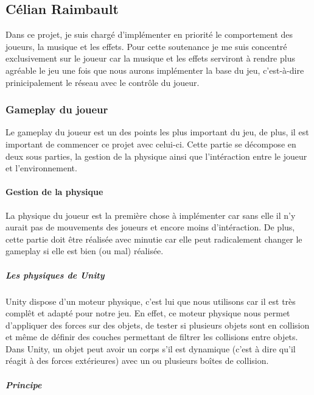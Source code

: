 \documentclass{article}
\begin{document}
\newpage
\subsection{Célian Raimbault}

Dans ce projet, je suis chargé d'implémenter en priorité le comportement des joueurs, la musique et les effets. Pour cette soutenance je me suis concentré exclusivement sur le joueur car la musique et les effets serviront à rendre plus agréable le jeu une fois que nous aurons implémenter la base du jeu, c'est-à-dire prinicipalement le réseau avec le contrôle du joueur.

\subsubsection{Gameplay du joueur}

Le gameplay du joueur est un des points les plus important du jeu, de plus, il est important de commencer ce projet avec celui-ci. Cette partie se décompose en deux sous parties, la gestion de la physique ainsi que l'intéraction entre le joueur et l'environnement.

\paragraph{Gestion de la physique}

La physique du joueur est la première chose à implémenter car sans elle il n'y aurait pas de mouvements des joueurs et encore moins d'intéraction.
De plus, cette partie doit être réalisée avec minutie car elle peut radicalement changer le gameplay si elle est bien (ou mal) réalisée.

\subparagraph{Les physiques de Unity}

Unity dispose d'un moteur physique, c'est lui que nous utilisons car il est très complêt et adapté pour notre jeu. En effet, ce moteur physique nous permet d'appliquer des forces sur des objets, de tester si plusieurs objets sont en collision et même de définir des couches permettant de filtrer les collisions entre objets. Dans Unity, un objet peut avoir un corps s'il est dynamique (c'est à dire qu'il réagit à des forces extérieures) avec un ou plusieurs boîtes de collision.

\subparagraph{Principe}
\end{document}
